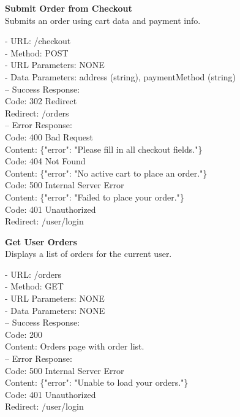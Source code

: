\begin{flushleft}
    \textbf{Submit Order from Checkout} \\
    Submits an order using cart data and payment info.

    - URL: /checkout \\
    - Method: POST \\
    - URL Parameters: NONE \\
    - Data Parameters: address (string), paymentMethod (string) \\
    – Success Response: \\
    Code: 302 Redirect \\
    Redirect: /orders \\
    – Error Response: \\
    Code: 400 Bad Request \\
    Content: \{"error": "Please fill in all checkout fields."\} \\
    Code: 404 Not Found \\
    Content: \{"error": "No active cart to place an order."\} \\
    Code: 500 Internal Server Error \\
    Content: \{"error": "Failed to place your order."\} \\
    Code: 401 Unauthorized \\
    Redirect: /user/login
\end{flushleft}

\begin{flushleft}
    \textbf{Get User Orders} \\
    Displays a list of orders for the current user.

    - URL: /orders \\
    - Method: GET \\
    - URL Parameters: NONE \\
    - Data Parameters: NONE \\
    – Success Response: \\
    Code: 200 \\
    Content: Orders page with order list. \\
    – Error Response: \\
    Code: 500 Internal Server Error \\
    Content: \{"error": "Unable to load your orders."\} \\
    Code: 401 Unauthorized \\
    Redirect: /user/login
\end{flushleft}

